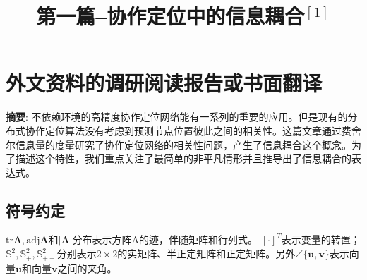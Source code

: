 %
%
\chapter{外文资料的调研阅读报告或书面翻译}
\title{第一篇--协作定位中的信息耦合$^{[1]}$}
\textbf{摘要}:
不依赖环境的高精度协作定位网络能有一系列的重要的应用。但是现有的分布式协作定位算法没有考虑到预测节点位置彼此之间的相关性。这篇文章通过费舍尔信息量的度量研究了协作定位网络的相关性问题，产生了信息耦合这个概念。为了描述这个特性，我们重点关注了最简单的非平凡情形并且推导出了信息耦合的表达式。
\section{符号约定}
$\text{tr}{\bm{A}},\text{adj}{\bm{A}}$和$
|\bm{A}|$分布表示方阵A的迹，伴随矩阵和行列式。
$[\cdot]^T$表示变量的转置；$\mathbb{S}^2,\mathbb{S}^2_+,\mathbb{S}^2_{++}$分别表示$2\times 2$的实矩阵、半正定矩阵和正定矩阵。另外$\angle \{ \bm{u},\bm{v}\}
$表示向量$\bm{u}$和向量$\bm{v}$之间的夹角。
